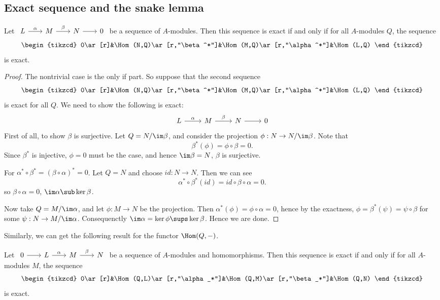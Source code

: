 \subsection{Exact sequence and the snake lemma}
\begin{proposition}
Let $\begin{tikzcd}[column sep=20pt,row sep=20pt]
L\ar[r,"\alpha"]&M\ar[r,"\beta"]&N\ar[r]&0
\end{tikzcd}$ be a sequence of $A$-modules. Then this sequence is exact if and only if for all $A$-modules $Q$, the sequence
\[\begin{tikzcd}
0\ar[r]&\Hom(N,Q)\ar[r,"\beta^*"]&\Hom(M,Q)\ar[r,"\alpha^*"]&\Hom(L,Q)
\end{tikzcd}\]
is exact.
\end{proposition}
\begin{proof}
The nontrivial case is the only if part. So suppose that the second sequence 
\[\begin{tikzcd}
0\ar[r]&\Hom(N,Q)\ar[r,"\beta^*"]&\Hom(M,Q)\ar[r,"\alpha^*"]&\Hom(L,Q)
\end{tikzcd}\]
is exact for all $Q$. We need to show the following is exact:
\[\begin{tikzcd}
L\ar[r,"\alpha"]&M\ar[r,"\beta"]&N\ar[r]&0
\end{tikzcd}\]
First of all, to show $\beta$ is surjective. Let $Q=N/\im\beta$, and consider the projection $\phi:N\to N/\im\beta$. Note that
\[\beta^*(\phi)=\phi\circ\beta=0.\]
Since $\beta^*$ is injective, $\phi=0$ must be the case, and hence $\im\beta=N$, $\beta$ is surjective.\par
For $\alpha^*\circ\beta^*=(\beta\circ\alpha)^*=0$. Let $Q=N$ and choose $id:N\to N$. Then we can see
\[\alpha^*\circ\beta^*(id)=id\circ\beta\circ\alpha=0.\]
so $\beta\circ\alpha=0$, $\im\alpha\sub\ker\beta$.\par 
Now take $Q=M/\im\alpha$, and let $\phi:M\to N$ be the projection. Then $\alpha^*(\phi)=\phi\circ\alpha=0$, hence by the exactness, $\phi=\beta^*(\psi)=\psi\circ\beta$ for some $\psi:N\to M/\im\alpha$. Consequenctly $\im\alpha=\ker\phi\sups\ker\beta$. Hence we are done.
\end{proof}
Similarly, we can get the following result for the functor $\Hom(Q,-)$.
\begin{proposition}
Let $\begin{tikzcd}[column sep=20pt,row sep=20pt]
0\ar[r]&L\ar[r,"\alpha"]&M\ar[r,"\beta"]&N
\end{tikzcd}$ be a sequence of $A$-modules and homomorphisms. Then this sequence is exact if and only if for all $A$-modules $M$, the sequence
\[\begin{tikzcd}
0\ar[r]&\Hom(Q,L)\ar[r,"\alpha_*"]&\Hom(Q,M)\ar[r,"\beta_*"]&\Hom(Q,N)
\end{tikzcd}\]
is exact.
\end{proposition}
